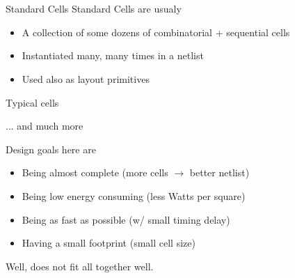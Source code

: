 \documentclass[aspectratio=169]{beamer}
\begin{document}
\section[Standard cells]{}
\begin{frame}{Standard Cells}
Standard Cells are usualy
	\begin{itemize}
        \setlength\itemsep{1em}
		\item A collection of some dozens of combinatorial + sequential cells
		\item Instantiated many, many times in a netlist
		\item Used also as layout primitives
	\end{itemize}
\end{frame}

\begin{frame}{Typical cells}
	\begin{figure}[h]
		\begin{center}
			\begin{circuitdiagram}{25}{25}
			\end{circuitdiagram}
		\end{center}
	\end{figure}

... and much more
\end{frame}

\begin{frame}{Design goals}
here are
	\begin{itemize}
        \setlength\itemsep{1em}
		\item Being almost complete (more cells $\rightarrow$ better netlist)
		\item Being low energy consuming (less Watts per square)
		\item Being as fast as possible (w/ small timing delay)
		\item Having a small footprint (small cell size)
	\end{itemize}

Well, does not fit all together well.
\end{frame}
\end{document}
